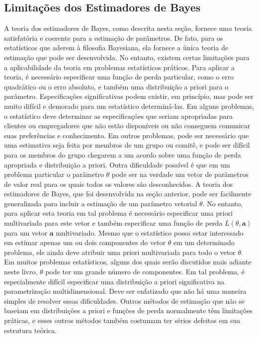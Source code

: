 \subsection*{Limitações dos Estimadores de Bayes}
A teoria dos estimadores de Bayes, como descrita nesta seção, fornece uma teoria satisfatória e coerente para a estimação de parâmetros. De fato, para os estatísticos que aderem à filosofia Bayesiana, ela fornece a única teoria de estimação que pode ser desenvolvida. No entanto, existem certas limitações para a aplicabilidade da teoria em problemas estatísticos práticos. Para aplicar a teoria, é necessário especificar uma função de perda particular, como o erro quadrático ou o erro absoluto, e também uma distribuição a priori para o parâmetro. Especificações significativas podem existir, em princípio, mas pode ser muito difícil e demorado para um estatístico determiná-las. Em alguns problemas, o estatístico deve determinar as especificações que seriam apropriadas para clientes ou empregadores que não estão disponíveis ou não conseguem comunicar suas preferências e conhecimento. Em outros problemas, pode ser necessário que uma estimativa seja feita por membros de um grupo ou comitê, e pode ser difícil para os membros do grupo chegarem a um acordo sobre uma função de perda apropriada e distribuição a priori.
Outra dificuldade possível é que em um problema particular o parâmetro $\theta$ pode ser na verdade um vetor de parâmetros de valor real para os quais todos os valores são desconhecidos. A teoria dos estimadores de Bayes, que foi desenvolvida na seção anterior, pode ser facilmente generalizada para incluir a estimação de um parâmetro vetorial $\theta$. No entanto, para aplicar esta teoria em tal problema é necessário especificar uma priori multivariada para este vetor e também especificar uma função de perda $L(\theta, \mathbf{a})$ para um vetor $\mathbf{a}$ multivariado. Mesmo que o estatístico possa estar interessado em estimar apenas um ou dois componentes do vetor $\theta$ em um determinado problema, ele ainda deve atribuir uma priori multivariada para todo o vetor $\theta$. Em muitos problemas estatísticos, alguns dos quais serão discutidos mais adiante neste livro, $\theta$ pode ter um grande número de componentes. Em tal problema, é especialmente difícil especificar uma distribuição a priori significativa na parametrização multidimensional.
Deve ser enfatizado que não há uma maneira simples de resolver essas dificuldades. Outros métodos de estimação que não se baseiam em distribuições a priori e funções de perda normalmente têm limitações práticas, e esses outros métodos também costumam ter sérios defeitos em sua estrutura teórica.

